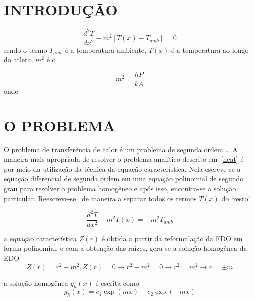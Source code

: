 \documentclass[a4paper, 12pt]{article}
\begin{document}
\vspace{0.5cm}

\section{INTRODUÇÃO}


\begin{equation}
  \label{heat}
  \frac{d^2 T}{dx^2} - m^2 [T(x) - T_{amb}] = 0
\end{equation}
sendo o termo $T_{amb}$ é a temperatura ambiente, $T(x)$ é a temperatura ao longo do atleta, $m^2$ é o 

\begin{equation}
  \label{m2}
  m^2 = \frac{hP}{kA}
\end{equation}
onde 
\section{O PROBLEMA}

O problema de transferência de calor é um problema de segunda ordem \ldots
A maneira mais apropriada de resolver o problema analítico descrito em~\ref{heat} é por meio da utilização da técnica da equação característica. Nela escreve-se a equação diferencial de segunda
ordem em uma equação polinomial de segundo grau para resolver o problema homogêneo e após isso, encontra-se a solução particular. Reescreve-se~\label{heat} de maneira a separar todos os termos $T(x)$ do
`resto'.

\begin{equation}
  \label{heatmodified}
  \frac{d^2 T}{dx^2} - m^2 T(x) = - m^2 T_{amb} 
\end{equation}

a equação característica $Z(r)$ é obtida a partir da reformulação da EDO em forma polinomial, e com a obtenção das raízes, gera-se a solução homogênea da EDO 
\begin{equation}
  \label{caracter}
  Z(r) = r^2 - m^2, Z(r) = 0  \rightarrow  r^2 - m^2 = 0 \rightarrow  r^2 = m^2 \rightarrow  r = \pm m 
\end{equation}

a solução homogênea $y_{h}(x)$ é escrita como 
\begin{equation}
  \label{homogenous}
  y_{h}(x) = c_1 \exp(mx) + c_2 \exp(-mx)
\end{equation}
\end{document}
